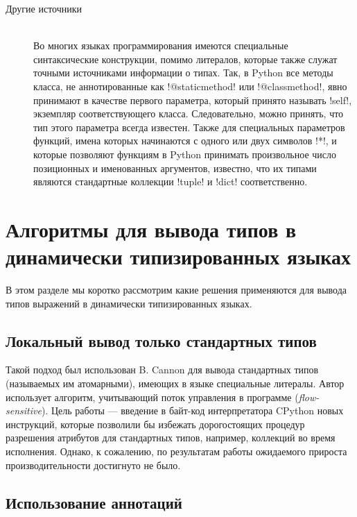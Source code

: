 \begin{description}
    \item[Другие источники] \hfill \\
        Во многих языках программирования имеются специальные синтаксические
        конструкции, помимо литералов, которые также служат точными источниками
        информации о типах. Так, в Python все методы класса, не аннотированные
        как !@staticmethod! или !@classmethod!, явно принимают в качестве первого
        параметра, который принято называть !self!, экземпляр соответствующего
        класса. Следовательно, можно принять, что тип этого параметра всегда
        известен.  Также для специальных параметров функций, имена которых
        начинаются с одного или двух символов !*!, и которые позволяют функциям в
        Python принимать произвольное число позиционных и именованных аргументов,
        известно, что их типами являются стандартные коллекции !tuple! и !dict!
        соответственно.

\end{description}
     
\section{Алгоритмы для вывода типов в динамически типизированных языках}

В этом разделе мы коротко рассмотрим какие решения применяются для вывода
типов выражений в динамически типизированных языках.

\subsection{Локальный вывод только стандартных типов}

Такой подход был использован B. Cannon для вывода стандартных типов (называемых им
атомарными), имеющих в языке специальные литералы. Автор использует алгоритм,
учитывающий поток управления в программе (\emph{flow-sensitive}). Цель работы
--- введение в байт-код интерпретатора CPython новых инструкций, которые
позволили бы избежать дорогостоящих процедур разрешения атрибутов для
стандартных типов, например, коллекций во время исполнения. Однако, к сожалению,
по результатам работы ожидаемого прироста производительности достигнуто не было.

\subsection{Использование аннотаций}


